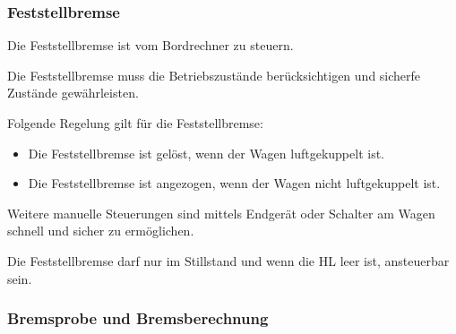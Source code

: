\subsubsection{Feststellbremse}
\begin{feat}
Die Feststellbremse ist vom Bordrechner zu steuern.
\end{feat}
\begin{feat}
Die Feststellbremse muss die Betriebszustände berücksichtigen und sicherfe Zustände gewährleisten.
\end{feat}
\begin{feat}
Folgende Regelung gilt für die Feststellbremse:
\begin{itemize}
    \item Die Feststellbremse ist gelöst, wenn der Wagen luftgekuppelt ist.
    \item Die Feststellbremse ist angezogen, wenn der Wagen nicht luftgekuppelt ist.
\end{itemize}
\end{feat}
\begin{rem} [zu Anf. 55]
Weitere manuelle Steuerungen sind mittels Endgerät oder \newline Schalter am Wagen schnell und sicher zu ermöglichen.
\end{rem}
\begin{feat}
Die Feststellbremse darf nur im Stillstand und wenn die HL leer ist, ansteuerbar sein.
\end{feat}


\subsubsection{Bremsprobe und Bremsberechnung}

